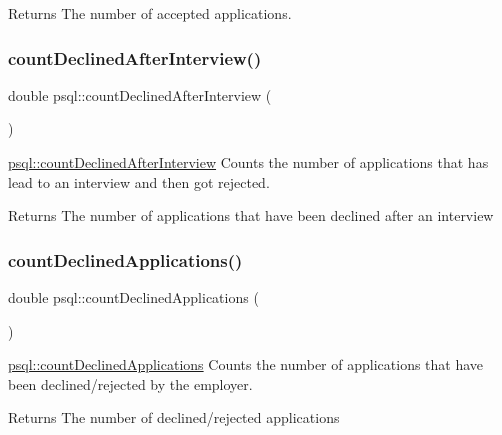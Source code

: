 \begin{DoxyReturn}{Returns}
The number of accepted applications. 
\end{DoxyReturn}
\mbox{\label{classpsql_a2ae512bc231446d5fccae84582395675}} 
\subsubsection{\texorpdfstring{count\+Declined\+After\+Interview()}{countDeclinedAfterInterview()}}
{\footnotesize\ttfamily double psql\+::count\+Declined\+After\+Interview (\begin{DoxyParamCaption}{ }\end{DoxyParamCaption})}



\hyperlink{classpsql_a2ae512bc231446d5fccae84582395675}{psql\+::count\+Declined\+After\+Interview} Counts the number of applications that has lead to an interview and then got rejected. 

\begin{DoxyReturn}{Returns}
The number of applications that have been declined after an interview 
\end{DoxyReturn}
\mbox{\label{classpsql_a40541367c3af9c0ac94e2fb92f00f53c}} 
\subsubsection{\texorpdfstring{count\+Declined\+Applications()}{countDeclinedApplications()}}
{\footnotesize\ttfamily double psql\+::count\+Declined\+Applications (\begin{DoxyParamCaption}{ }\end{DoxyParamCaption})}



\hyperlink{classpsql_a40541367c3af9c0ac94e2fb92f00f53c}{psql\+::count\+Declined\+Applications} Counts the number of applications that have been declined/rejected by the employer. 

\begin{DoxyReturn}{Returns}
The number of declined/rejected applications 
\end{DoxyReturn}
\mbox{\label{classpsql_a84c1fdea2d09783a39677c4f79d924fc}} 

